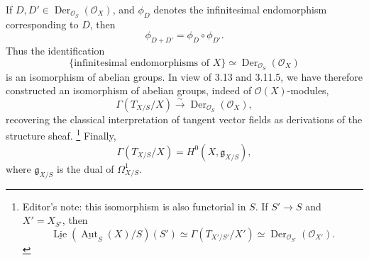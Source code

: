 If \(D,D'\in\operatorname{Der}_{\mathcal O_S}(\mathcal O_X)\), and
\(\phi_D\) denotes the infinitesimal endomorphism corresponding to \(D\),
then
\[
  \phi_{D+D'}=\phi_D\circ\phi_{D'}.
\]
Thus the identification
\[
  \{\text{infinitesimal endomorphisms of }X\}
  \simeq\operatorname{Der}_{\mathcal O_S}(\mathcal O_X)
\]
is an isomorphism of abelian groups. In view of 3.13 and 3.11.5, we have
therefore constructed an isomorphism of abelian groups, indeed of
\(\mathcal O(X)\)-modules,
\[
  \Gamma(T_{X/S}/X)
  \xrightarrow{\sim}\operatorname{Der}_{\mathcal O_S}(\mathcal O_X),
\]
recovering the classical interpretation of tangent vector fields as
derivations of the structure sheaf.
\footnote{Editor's note: this isomorphism is also functorial in \(S\). If
\(S'\to S\) and \(X'=X_{S'}\), then
\[
  \underline{\operatorname{Lie}}
    (\underline{\operatorname{Aut}}_S(X)/S)(S')
  \simeq\Gamma(T_{X'/S'}/X')
  \simeq\operatorname{Der}_{\mathcal O_{S'}}(\mathcal O_{X'}).
\]}
Finally,
\[
  \Gamma(T_{X/S}/X)=H^0(X,\mathfrak g_{X/S}),
\]
where \(\mathfrak g_{X/S}\) is the dual of \(\Omega^1_{X/S}\).

